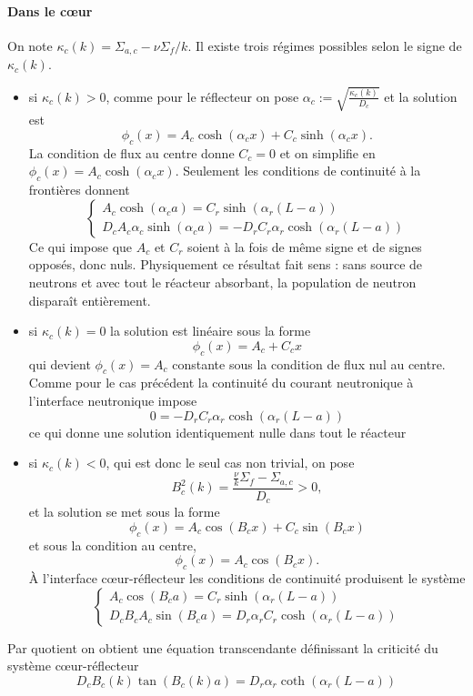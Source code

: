 \documentclass{article}
\begin{document}
\paragraph{Dans le cœur} On note $\kappa_c(k)=\Sigma_{a,c}-\nu\Sigma_f/k$. Il existe trois régimes possibles selon le signe de $\kappa_c(k)$.
\begin{itemize}
    \item si $\kappa_c(k)>0$, comme pour le réflecteur on pose $\alpha_c := \sqrt{\frac{\kappa_c(k)}{D_c}}$ et la solution est
\[ \phi_c(x) = A_c\cosh(\alpha_cx) + C_c\sinh(\alpha_cx). \]
La condition de flux au centre donne $C_c = 0$ et on simplifie en $\phi_c(x)= A_c\cosh(\alpha_cx)$.
Seulement les conditions de continuité à la frontières donnent 
    \[
        \begin{cases}
            A_c\cosh(\alpha_ca) = C_r\sinh(\alpha_r(L-a))\\
            D_cA_c\alpha_c\sinh(\alpha_ca) = -D_rC_r\alpha_r\cosh(\alpha_r(L-a))
        \end{cases}
    \]
Ce qui impose que $A_c$ et $C_r$ soient à la fois de même signe et de signes opposés, donc nuls. Physiquement ce résultat fait sens : sans source de neutrons et avec tout le réacteur absorbant, la population de neutron disparaît entièrement.

    \item si $\kappa_c(k) = 0$ la solution est linéaire sous la forme
\[\phi_c(x) = A_c + C_cx\]
qui devient $\phi_c(x) = A_c$ constante sous la condition de flux nul au centre. Comme pour le cas précédent la continuité du courant neutronique à l'interface neutronique impose 
\[0 = -D_rC_r\alpha_r\cosh(\alpha_r(L-a))\]
ce qui donne une solution identiquement nulle dans tout le réacteur 

    \item si $\kappa_c(k) < 0$, qui est donc le seul cas non trivial, on pose
\[
B_c^2(k)=\frac{\frac{\nu}{k}\Sigma_f-\Sigma_{a,c}}{D_c}>0,
\]
et la solution se met sous la forme
\[\phi_c(x) = A_c\cos(B_cx) + C_c\sin(B_cx)\]
et sous la condition au centre,
\[\phi_c(x) = A_c\cos(B_cx).\]
À l'interface cœur-réflecteur les conditions de continuité produisent le système 
\[\begin{cases}
    A_c\cos(B_ca) = C_r\sinh(\alpha_r(L-a)) \\
    D_cB_cA_c\sin(B_ca) = D_r\alpha_rC_r\cosh(\alpha_r(L-a))
\end{cases}
\]
\end{itemize}

Par quotient on obtient une équation transcendante définissant la criticité du système cœur-réflecteur 
\begin{equation}
    \boxed{D_cB_c(k)\tan(B_c(k)a) = D_r\alpha_r\coth(\alpha_r(L-a))}
\end{equation}    
    
\end{document}

